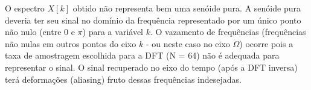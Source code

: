 \documentclass{article}
\begin{document}
\begin{enumerate}[(a)]
O espectro $X[k]$ obtido não representa bem uma senóide pura. A senóide pura deveria ter seu sinal no domínio da frequência representado por um único ponto não nulo (entre $0$ e $\pi$) para a variável $k$. O vazamento de frequências (frequências não nulas em outros pontos do eixo $k$ - ou neste caso no eixo $\Omega$) ocorre pois a taxa de amostragem escolhida para a DFT (N = 64) não é adequada para representar o sinal. O sinal recuperado no eixo do tempo (após a DFT inversa) terá deformações (aliasing) fruto dessas frequências indesejadas.


\end{enumerate}
\end{document}
